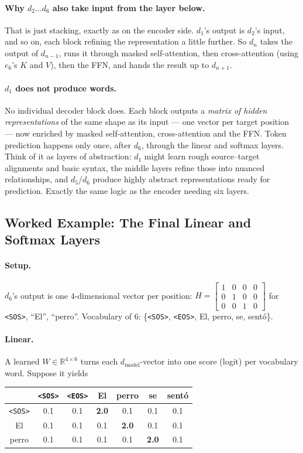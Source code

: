 \documentclass[11pt,a4paper]{article}
\begin{document}
\paragraph{Why $d_2 \ldots d_6$ also take input from the layer below.} That is just stacking,
exactly as on the encoder side. $d_1$'s output is $d_2$'s input, and so on, each block
refining the representation a little further. So $d_n$ takes the output of $d_{n-1}$, runs it
through masked self-attention, then cross-attention (using $e_6$'s $K$ and $V$), then the FFN,
and hands the result up to $d_{n+1}$.

\paragraph{$d_1$ does not produce words.} No individual decoder block does. Each block outputs
a \emph{matrix of hidden representations} of the same shape as its input --- one vector per
target position --- now enriched by masked self-attention, cross-attention and the FFN. Token
prediction happens only once, after $d_6$, through the linear and softmax layers. Think of it
as layers of abstraction: $d_1$ might learn rough source--target alignments and basic syntax,
the middle layers refine those into nuanced relationships, and $d_5$/$d_6$ produce highly
abstract representations ready for prediction. Exactly the same logic as the encoder needing
six layers.

\subsection{Worked Example: The Final Linear and Softmax Layers}

\paragraph{Setup.} $d_6$'s output is one 4-dimensional vector per position:
$H = \begin{bmatrix}1&0&0&0\\0&1&0&0\\0&0&1&0\end{bmatrix}$ for \texttt{<SOS>}, ``El'',
``perro''. Vocabulary of 6: \{\texttt{<SOS>}, \texttt{<EOS>}, El, perro, se, sent\'o\}.

\paragraph{Linear.} A learned $W \in \mathbb{R}^{4 \times 6}$ turns each
$d_{\text{model}}$-vector into one score (logit) per vocabulary word. Suppose it yields
\begin{center}
\begin{tabular}{c|cccccc}
 & \texttt{<SOS>} & \texttt{<EOS>} & El & perro & se & sent\'o \\
\hline
\texttt{<SOS>} & 0.1 & 0.1 & \textbf{2.0} & 0.1 & 0.1 & 0.1 \\
El & 0.1 & 0.1 & 0.1 & \textbf{2.0} & 0.1 & 0.1 \\
perro & 0.1 & 0.1 & 0.1 & 0.1 & \textbf{2.0} & 0.1 \\
\end{tabular}
\end{center}
\end{document}
